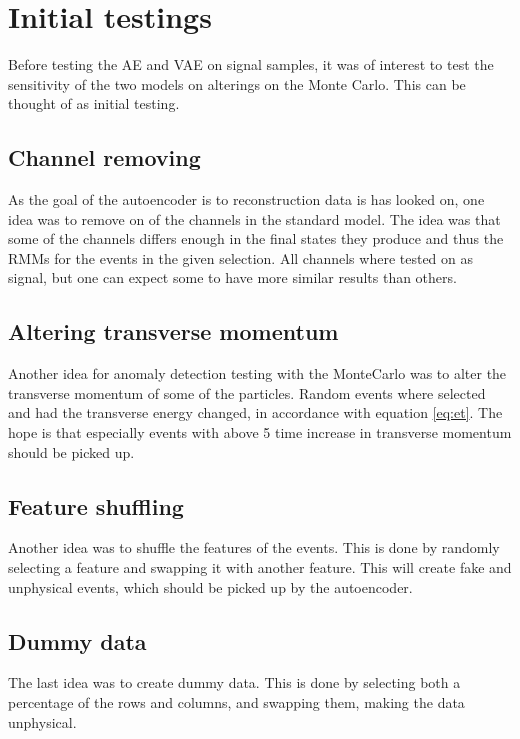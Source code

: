 \section*{Initial testings}
Before testing the AE and VAE on signal samples, it was of interest to test the sensitivity of the
two models on alterings on the Monte Carlo. This can be thought of as initial testing. 
\subsection*{Channel removing}
As the goal of the autoencoder is to reconstruction data is has looked on, one idea was to remove on of the channels in the standard model.
The idea was that some of the channels differs enough in the final states they produce and thus the RMMs for the events in the given selection. 
All channels where tested on as signal, but one can expect some to have more similar results than others. 

\subsection*{Altering transverse momentum}
Another idea for anomaly detection testing with the MonteCarlo was to alter the transverse momentum of some of the particles. Random events where
selected and had the transverse energy changed, in accordance with equation \ref{eq:et}. The hope is that especially events with above 5 time 
increase in transverse momentum should be picked up. 

\subsection*{Feature shuffling}
Another idea was to shuffle the features of the events. This is done by randomly selecting a feature and swapping it with another feature. 
This will create fake and unphysical events, which should be picked up by the autoencoder. 
\subsection*{Dummy data}
The last idea was to create dummy data. This is done by selecting both a percentage of the rows and columns, and swapping them, 
making the data unphysical. 